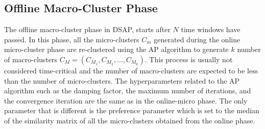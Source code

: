 \documentclass[../UNBThesis2.tex]{subfiles}
\begin{document}
\begin{itemize}[leftmargin=*]



\end{itemize}


\subsection{ Offline Macro-Cluster Phase}

The offline macro-cluster phase in DSAP, starts after $N$ time windows have passed. In this phase, all the micro-clusters $C_m$ generated during the online micro-cluster phase are re-clustered using the AP algorithm to generate $k$ number of macro-clusters $C_M = (C_{M_1}, C_{M_2}, ..., C_{M_k})$. This process is usually not considered time-critical and the number of macro-clusters are expected to be less than the number of micro-clusters. The hyperparameters related to the AP algorithm such as the damping factor, the maximum number of iterations, and the convergence iteration are the same as in the online-micro phase. The only parameter that is different is the preference parameter which is set to the median of the similarity matrix of all the micro-clusters obtained from the online phase.

\end{document}
